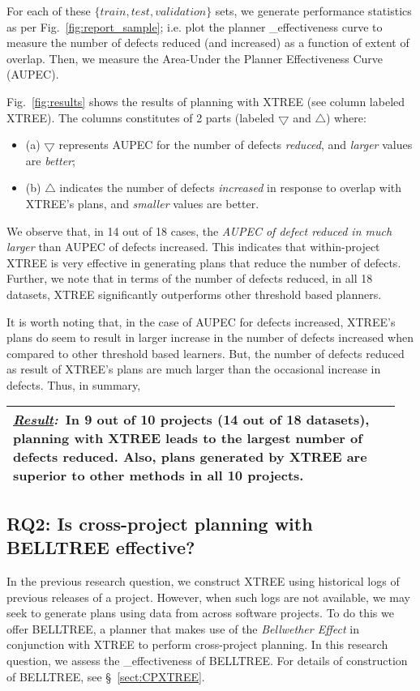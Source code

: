 \documentclass[10pt, journal, compsoc]{IEEEtran}
\newcommand{\result}[1]{
\vspace{0.2cm}
\noindent\begin{minipage}{\linewidth}
\begin{tabular}{|p{0.95\linewidth}|}
\hline\vspace{-0.2cm}
\textbf{\textit{\underline{Result}:}}~#1\\\hline
\end{tabular}
\end{minipage}\bigstrut
}
\newcommand{\tion}[1]{\S~\ref{sect:#1}}
\newcommand{\fig}[1]{Fig.~\ref{fig:#1}}
\begin{document}
For each of these $\{train, test, validation\}$ sets, we generate performance statistics as per \fig{report_sample}; i.e. plot the planner _effectiveness curve to measure the number of defects reduced (and increased) as a function of extent of overlap. Then, we measure the Area-Under the Planner Effectiveness Curve (AUPEC).

\fig{results}\protect{} shows the results of planning with XTREE (see column labeled XTREE). The columns constitutes of 2 parts (labeled $\bigtriangledown$ and $\bigtriangleup$) where: 
\begin{itemize}[leftmargin=-1pt]
  \item[] (a) $\bigtriangledown$ represents AUPEC for the number of defects \textit{reduced}, and \textit{larger} values are \textit{better};
  \item[] (b) $\bigtriangleup$ indicates the number of defects \textit{increased} in response to overlap with XTREE's plans, and \textit{smaller} values are better. 
\end{itemize}

We observe that,  in 14 out of 18 cases, the \textit{AUPEC of defect reduced in much larger} than AUPEC of defects increased. This indicates that within-project XTREE is very effective in generating plans that reduce the number of defects. Further, we note that in terms of the number of defects reduced, in all 18 datasets, XTREE significantly outperforms other threshold based planners.

It is worth noting that, in the case of AUPEC for defects increased, XTREE's plans do seem to result in larger increase in the number of defects increased when compared to other threshold based learners. But, the number of defects reduced as result of XTREE's plans are much larger than the occasional increase in defects. Thus, in summary, 

\result{In 9 out of 10 projects (14 out of 18 datasets), planning with XTREE leads to the largest number of defects reduced. Also, plans generated by XTREE are superior to other methods in all 10 projects.}



\subsection*{{\bf RQ2: Is cross-project planning with BELLTREE effective?}}

In the previous research question, we construct XTREE using historical logs of previous releases of a project. However, when such logs are not available, we may seek to generate plans using data from across software projects. To do this we offer BELLTREE, a planner that makes use of the \textit{Bellwether Effect} in conjunction with XTREE to perform cross-project planning. In this research question, we assess the _effectiveness of BELLTREE. For details of construction of BELLTREE, see \tion{CPXTREE}.
\end{document}
